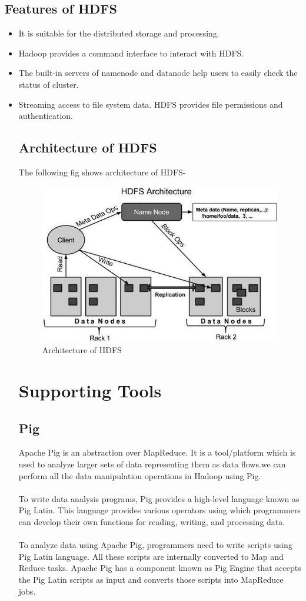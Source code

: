 \subsection{Features of HDFS}
\begin{itemize}
\item It is suitable for the distributed storage and processing.
\item Hadoop provides a command interface to interact with HDFS.
\item The built-in servers of namenode and datanode help users to easily check the status of cluster.
\item Streaming access to file system data.
HDFS provides file permissions and authentication.
\subsection{Architecture of HDFS}
The following fig shows architecture of HDFS-
\begin{figure}[h!]
	\centering
	\includegraphics[width=\linewidth]{hdfs_architecture.jpg}
	\caption{Architecture of HDFS}
\end{figure}
\section{Supporting Tools}
\subsection{Pig}
Apache Pig is an abstraction over MapReduce. It is a tool/platform which is used to analyze larger sets of data representing them as data flows.we can perform all the data manipulation operations in Hadoop using Pig.
\\ 
\\
To write data analysis programs, Pig provides a high-level language known as Pig Latin. This language provides various operators using which programmers can develop their own functions for reading, writing, and processing data.
\\
\\
To analyze data using Apache Pig, programmers need to write scripts using Pig Latin language. All these scripts are internally converted to Map and Reduce tasks. Apache Pig has a component known as Pig Engine that accepts the Pig Latin scripts as input and converts those scripts into MapReduce jobs.

\end{itemize}
